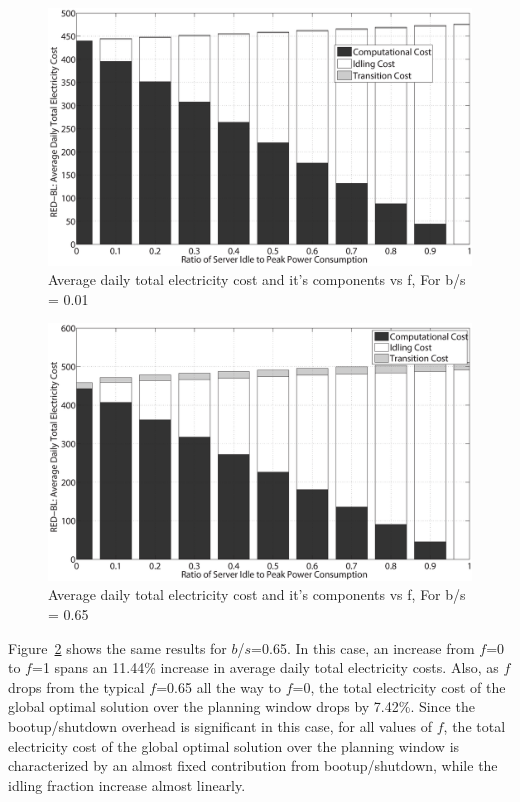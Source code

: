 \begin{figure}
\includegraphics[width=1\textwidth]{pics/fvar-0.01bs.eps}
\caption{Average daily total electricity cost and it's components vs f, For b\slash s = 0.01}
\label{fig:fvar1}
\end{figure}

\begin{figure}
\includegraphics[width=1\textwidth]{pics/fvar-0.65bs.eps}
\caption{Average daily total electricity cost and it's components vs f, For b\slash s = 0.65}
\label{fig:fvar2}
\end{figure}

Figure~\ref{fig:fvar2} shows the same results for $b$/$s$=0.65. In this case, an increase from $f$=0 to $f$=1 spans an 11.44\% increase in average daily total electricity costs. Also, as $f$ drops from the typical $f$=0.65 all the way to $f$=0, the total electricity cost of the global optimal solution over the planning window drops by 7.42\%. Since the bootup/shutdown overhead is significant in this case, for all values of $f$, the total electricity cost of the global optimal solution over the planning window is characterized by an almost fixed contribution from bootup/shutdown, while the idling fraction increase almost linearly.

